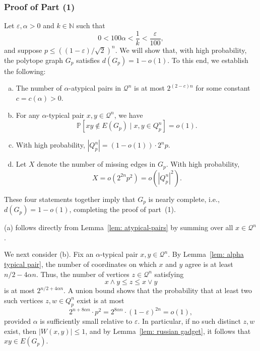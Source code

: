 \documentclass[11pt]{article}
\theoremstyle{definition}
\theoremstyle{plain}
\begin{document}
\subsubsection*{Proof of Part (1)}

Let \( \varepsilon, \alpha > 0 \) and \( k \in \mathbb{N} \) such that
\[
0 < 100\alpha < \frac{1}{k} < \frac{\varepsilon}{100},
\]
and suppose \( p \leq \left((1 - \varepsilon)/\sqrt{2}\right)^n \). We will show that, with high probability, the polytope graph \( G_p \) satisfies \( d(G_p) = 1 - o(1) \).
To this end, we establish the following:

\begin{enumerate}[(a)]

    \item The number of \(\alpha\)-atypical pairs in \( \mathcal{Q}^n \) is at most \( 2^{(2 - c)n} \) for some constant \( c = c(\alpha) > 0 \).
    
    \item For any \(\alpha\)-typical pair \( x, y \in \mathcal{Q}^n \), we have
    \[
    \mathbb{P}[xy \notin E(G_p) \mid x, y \in Q_p^n] = o(1).
    \]
    
    \item With high probability, \( |Q_p^n| = (1 - o(1)) \cdot 2^n p \).
    
    \item Let \( X \) denote the number of missing edges in \( G_p \). With high probability,
    \[
    X = o(2^{2n}p^2) = o(|Q_p^n|^2).
    \]

\end{enumerate}
These four statements together imply that \( G_p \) is nearly complete, i.e., \( d(G_p) = 1 - o(1) \), completing the proof of part~(1).

\smallskip

(a) follows directly from Lemma~\ref{lem: atypical-pairs} by summing over all \( x \in \mathcal{Q}^n \).

We next consider (b). Fix an \(\alpha\)-typical pair \( x, y \in \mathcal{Q}^n \). By Lemma~\ref{lem: alpha typical pair}, the number of coordinates on which \( x \) and \( y \) agree is at least \( n/2 - 4\alpha n \). Thus, the number of vertices \( z \in \mathcal{Q}^n \) satisfying
\[
x \land y \leq z \leq x \lor y
\]
is at most \( 2^{n/2 + 4\alpha n} \). A union bound shows that the probability that at least two such vertices \( z,w \in Q_p^n \) exist is at most
\[
2^{n + 8\alpha n} \cdot p^2 = 2^{8\alpha n} \cdot (1 - \varepsilon)^{2n} = o(1),
\]
provided \( \alpha \) is sufficiently small relative to \( \varepsilon \). In particular, if no such distinct \( z,w \) exist, then \( |W(x, y)| \leq 1 \), and by Lemma~\ref{lem: russian gadget}, it follows that \( xy \in E(G_p) \).
\end{document}
